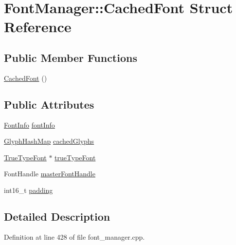 \hypertarget{struct_font_manager_1_1_cached_font}{\section{Font\+Manager\+:\+:Cached\+Font Struct Reference}
\label{struct_font_manager_1_1_cached_font}
}
\subsection*{Public Member Functions}
\begin{DoxyCompactItemize}
\item 
\hyperlink{struct_font_manager_1_1_cached_font_a5db5b036ec8c354d4a6342c0027ca856}{Cached\+Font} ()
\end{DoxyCompactItemize}
\subsection*{Public Attributes}
\begin{DoxyCompactItemize}
\item 
\hyperlink{struct_font_info}{Font\+Info} \hyperlink{struct_font_manager_1_1_cached_font_a7dfa017c5bb591939d494ff186dbd35a}{font\+Info}
\item 
\hyperlink{font__manager_8cpp_ac2b9a333a4f57fe7bd8872b8609ae0d8}{Glyph\+Hash\+Map} \hyperlink{struct_font_manager_1_1_cached_font_a859b833cb1fdedf9b9f9f3ea50d7cb6a}{cached\+Glyphs}
\item 
\hyperlink{class_true_type_font}{True\+Type\+Font} $\ast$ \hyperlink{struct_font_manager_1_1_cached_font_ae16bb9253da5738d86915ab81cda7410}{true\+Type\+Font}
\item 
Font\+Handle \hyperlink{struct_font_manager_1_1_cached_font_a14a1c176147ca21712f1ec7aac149c89}{master\+Font\+Handle}
\item 
int16\+\_\+t \hyperlink{struct_font_manager_1_1_cached_font_ae31ff1b08cc30df413f5bea1f376f6e0}{padding}
\end{DoxyCompactItemize}


\subsection{Detailed Description}


Definition at line 428 of file font\+\_\+manager.\+cpp.



